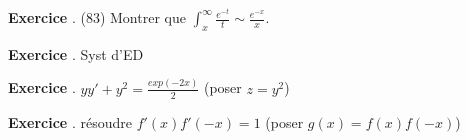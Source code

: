 \documentclass[10pt,a4paper]{article}
\newcounter{question}
\newcounter{exo}
\newenvironment{exo}{\vspace{0.5cm}\setcounter{question}{0}\addtocounter{exo}{1} \noindent \textbf{Exercice \theexo}. \normalsize }{\par}
\begin{document}
	\begin{exo}
		(83) Montrer que $\int_{x}^{\infty} \frac{e^{-t}}{t} \sim \frac{e^{-x}}{x}$.
	\end{exo}

	\begin{exo}
		Syst d'ED
	\end{exo}	

	\begin{exo}
		$yy' + y^2 = \frac{exp(-2x)}{2}$ (poser $z = y^2$)
	\end{exo}
	
	\begin{exo}
		résoudre $f'(x) f'(-x) = 1$ (poser $g(x) = f(x) f(-x)$)
	\end{exo}
\end{document}
